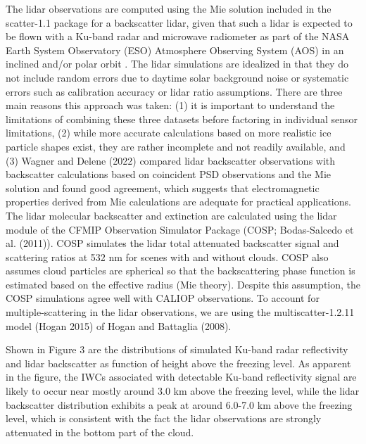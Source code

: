 \documentclass{ametsocV6.1}
\begin{document}
The lidar observations are computed using the Mie solution included in the scatter-1.1 
package for a backscatter lidar, given that such a lidar is expected to be flown with a 
Ku-band radar and microwave radiometer as part of the NASA Earth System Observatory 
(ESO) Atmosphere Observing System (AOS) in an inclined and/or polar orbit \citep{yorks2022}.
The lidar simulations are idealized in that they do not include random errors due to daytime 
solar background noise or systematic errors such as calibration accuracy or lidar ratio
assumptions. There are three main reasons this approach was taken: (1) it is important to
understand the limitations of combining these three datasets before factoring in 
individual sensor limitations, (2) while more accurate calculations based on more 
realistic ice particle shapes exist, they are rather incomplete and not readily available,
and (3) Wagner and Delene (2022) compared lidar backscatter observations with backscatter 
calculations based on coincident PSD observations and the Mie solution and found good 
agreement, which suggests that electromagnetic properties derived from Mie calculations 
are adequate for practical applications. The lidar molecular backscatter and extinction
are calculated using the lidar module of the CFMIP Observation Simulator Package (COSP; 
Bodas-Salcedo et al. (2011)). COSP simulates the lidar total attenuated backscatter 
signal and scattering ratios at 532 nm for scenes with and without clouds. COSP also 
assumes cloud particles are spherical so that the backscattering phase function is 
estimated based on the effective radius (Mie theory). Despite this assumption, the 
COSP simulations agree well with CALIOP observations. To account for multiple-scattering 
in the lidar observations, we are using the multiscatter-1.2.11 model (Hogan 2015) of 
Hogan and Battaglia (2008). 

Shown in Figure 3 are the distributions of simulated Ku-band radar reflectivity and 
lidar backscatter as function of height above the freezing level.
As apparent in the figure, the IWCs associated with detectable Ku-band reflectivity
signal are likely to
occur near mostly around 3.0 km above the freezing level, while the lidar backscatter
distribution exhibits a peak at around 6.0-7.0 km
above the freezing level, which is consistent with the fact the lidar observations
are strongly attenuated in the bottom part of the cloud.  
\end{document}
